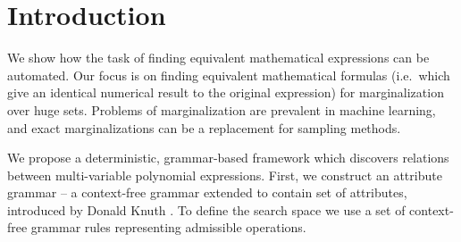 \section{Introduction} \label{introduction} 

We show how the task of finding equivalent
mathematical expressions can be automated. Our focus is on finding equivalent
mathematical formulas (i.e.~which give an identical numerical result
to the original expression) for marginalization over huge sets. 
Problems of marginalization are prevalent in machine learning, and 
exact marginalizations can be a replacement for sampling methods.



We propose a deterministic, grammar-based framework which discovers
relations between multi-variable polynomial expressions. First, we
construct an attribute grammar -- a context-free grammar extended to
contain set of attributes, introduced by Donald Knuth
\cite{knuth1968semantics}. To define the search space we use a set of
context-free grammar rules representing admissible operations. 



